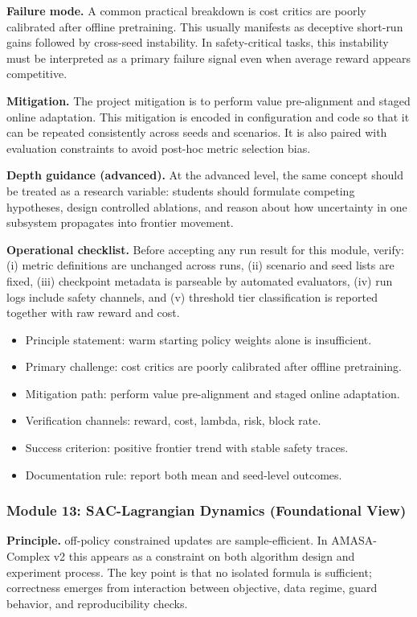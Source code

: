 \documentclass[conference]{IEEEtran}
\begin{document}
\textbf{Failure mode.} A common practical breakdown is cost critics are poorly calibrated after offline pretraining. This usually manifests as deceptive short-run gains followed by cross-seed instability. In safety-critical tasks, this instability must be interpreted as a primary failure signal even when average reward appears competitive.

\textbf{Mitigation.} The project mitigation is to perform value pre-alignment and staged online adaptation. This mitigation is encoded in configuration and code so that it can be repeated consistently across seeds and scenarios. It is also paired with evaluation constraints to avoid post-hoc metric selection bias.

\textbf{Depth guidance (advanced).} At the advanced level, the same concept should be treated as a research variable: students should formulate competing hypotheses, design controlled ablations, and reason about how uncertainty in one subsystem propagates into frontier movement.

\textbf{Operational checklist.} Before accepting any run result for this module, verify: (i) metric definitions are unchanged across runs, (ii) scenario and seed lists are fixed, (iii) checkpoint metadata is parseable by automated evaluators, (iv) run logs include safety channels, and (v) threshold tier classification is reported together with raw reward and cost.

\begin{itemize}[leftmargin=*]
  \item Principle statement: warm starting policy weights alone is insufficient.
  \item Primary challenge: cost critics are poorly calibrated after offline pretraining.
  \item Mitigation path: perform value pre-alignment and staged online adaptation.
  \item Verification channels: reward, cost, lambda, risk, block rate.
  \item Success criterion: positive frontier trend with stable safety traces.
  \item Documentation rule: report both mean and seed-level outcomes.
\end{itemize}


\subsubsection{Module 13: SAC-Lagrangian Dynamics (Foundational View)}
\textbf{Principle.} off-policy constrained updates are sample-efficient. In AMASA-Complex v2 this appears as a constraint on both algorithm design and experiment process. The key point is that no isolated formula is sufficient; correctness emerges from interaction between objective, data regime, guard behavior, and reproducibility checks.
\end{document}
